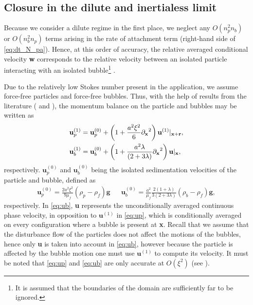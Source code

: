 \subsection{Closure in the dilute and inertialess limit}

Because we consider a dilute regime in the first place, we neglect any $O(n_p^2n_b)$ or $O(n_b^2n_p)$ terms arising in the rate of attachment term (right-hand side of \eqref{eq:dt_N_pa}).
Hence, at this order of accuracy, the relative averaged conditional velocity \textbf{w} corresponds to the relative velocity between an isolated particle interacting with an isolated bubble\footnote{It is assumed that the boundaries of the domain are sufficiently far to be ignored.} \citep{hinch1977averaged,loewenberg1994flotation}. 

Due to the relatively low Stokes number present in the application, we assume force-free particles and force-free bubbles.  
Thus, with the help of results from the literature (\citet{batchelor1982sedimentation} and \citet[Chapter 8]{kim2013microhydrodynamics}), the momentum balance on the particle and bubbles may be written as
\begin{align}
\label{eq:up}
    \textbf{u}_p^{(1)}
    &=
    \textbf{u}_p^{(0)}
    + \left(1 +\frac{a^2\xi^2}{6} \pddx^2\right) \textbf{u}^{(1)}|_{\textbf{x}+\textbf{r}},\\
    \label{eq:ub}
    \textbf{u}_b^{(1)}
    &=
    \textbf{u}_b^{(0)}
    + \left(1 +\frac{a^2\lambda}{(2+3\lambda)} \pddx^2\right) \textbf{u}|_{\textbf{x}},
\end{align}
respectively. 
$\textbf{u}_p^{(0)}$ and $\textbf{u}_b^{(0)}$ being the isolated sedimentation velocities of the particle and bubble, defined as
\begin{align}
    \textbf{u}_p^{(0)} 
    =
    \frac{2a^2\xi^2}{9\mu_f}(\rho_p - \rho_f)\textbf{g}
    &&
    \textbf{u}_b^{(0)}
    =
    \frac{a^2}{\mu_f}\frac{2(1+\lambda)}{3(2+3\lambda)}(\rho_b - \rho_f)\textbf{g},
\end{align}
respectively. 
In \eqref{eq:ub}, \textbf{u} represents the unconditionally averaged continuous phase velocity, in opposition to $\textbf{u}^{(1)}$ in \eqref{eq:up}, which is conditionally averaged on every configuration where a bubble is present at \textbf{x}. 
Recall that we assume that the disturbance flow of the particles does not affect the motions of the bubbles, hence only \textbf{u} is taken into account in \eqref{eq:ub}, however because the particle is affected by the bubble motion one must use $\textbf{u}^{(1)}$ to compute its velocity. 
It must be noted that \eqref{eq:up} and \eqref{eq:ub} are only accurate at $O(\xi^2)$ (see \citet[section 4.6]{batchelor1982sedimentation}). 


